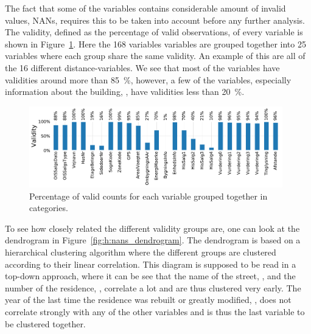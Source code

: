 The fact that some of the variables contains considerable amount of invalid values, NANs, requires this to be taken into account before any further analysis. The validity, defined as the percentage of valid observations, of every variable is shown in Figure~\ref{fig:h:nans}. Here the 168 variables variables are grouped together into 25 variables where each group share the same validity. An example of this are all of the 16 different distance-variables. We see that most of the variables have validities around more than 
\SI{85}{\percent}, however, a few of the variables, especially information about the building, , have validities less than \SI{20}{\percent}. 

\begin{figure}
  \includegraphics[width=0.98\textwidth, trim=0 0 0 0, clip]{figures/housing/missing_bar.pdf}
  \caption[Validity of input features]
          {Percentage of valid counts for each variable grouped together in categories.}
  \label{fig:h:nans}
\end{figure}

To see how closely related the different validity groups are, one can look at the dendrogram in Figure~\ref{fig:h:nans_dendrogram}. The dendrogram is based on a hierarchical clustering algorithm \citep{virtanenSciPyFundamentalAlgorithms2019} where the different groups are clustered according to their linear correlation. This diagram is supposed to be read in a top-down approach, where it can be see that the name of the street, , and the number of the residence, , correlate a lot and are thus clustered very early. The year of the last time the residence was rebuilt or greatly modified, , does not correlate strongly with any of the other variables and is thus the last variable to be clustered together. 

